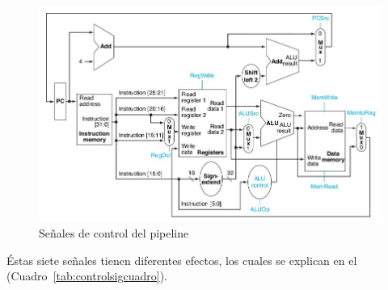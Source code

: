 \documentclass[12pt]{article}
\begin{document}
\begin{figure}[ht]
\centering
\hspace*{-1cm}
\includegraphics[width=1.1\textwidth]{imagenes/controlsig.jpeg}
\caption{Señales de control del pipeline \cite{patterson}}
\label{fig:controlsig}
\end{figure}

Éstas siete señales tienen diferentes efectos, los cuales se explican en el (Cuadro~\ref{tab:controlsigcuadro}).
\end{document}
